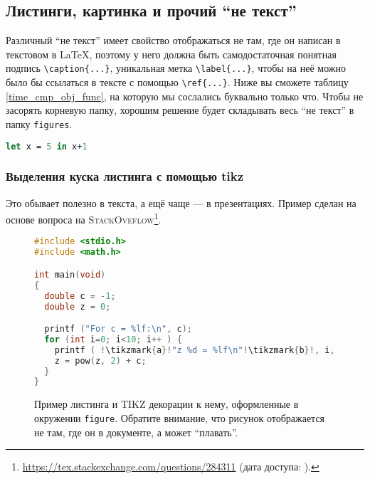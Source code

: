 \subsection{Листинги, картинка и прочий ``не текст''}

Различный ``не текст'' имеет свойство отображаться не там, где он написан в текстовом в \LaTeX{}, поэтому у него должна быть самодостаточ\-ная понятная подпись \verb=\caption{...}=, уникальная метка \verb=\label{...}=, чтобы на неё можно было бы ссылаться в тексте с помощью \verb=\ref{...}=. Ниже вы сможете таблицу \ref{time_cmp_obj_func}, на которую мы сослались буквально только что.
Чтобы не засорять корневую папку, хорошим решение будет складывать весь ``не текст'' в папку \texttt{figures}.

\begin{lstlisting}[caption={Название для листинга кода. Достаточно длинное, чтобы люди, которые смотрят картинку сразу после названия статьи (т.~е. все люди), смогли разобраться и понять к чему в статье листинги, картинки и прочий ``не текст''.}, language=Caml, frame=single]
  let x = 5 in x+1
\end{lstlisting}



\subsubsection{Выделения куска листинга с помощью tikz}
Это обывает полезно в текста, а ещё чаще --- в презентациях. Пример сделан на основе вопроса на \textsc{StackOveflow}\footnote{\url{https://tex.stackexchange.com/questions/284311} (дата доступа:   ).}.

\begin{figure}
\begin{lstlisting}[escapechar=!,basicstyle=\ttfamily, language=c]
#include <stdio.h>
#include <math.h>

int main(void)
{
  double c = -1;
  double z = 0;

  printf ("For c = %lf:\n", c);
  for (int i=0; i<10; i++ ) {
    printf ( !\tikzmark{a}!"z %d = %lf\n"!\tikzmark{b}!, i, z);
    z = pow(z, 2) + c;
  }
}
\end{lstlisting}

\caption{Пример листинга и \textsc{TIKZ} декорации к нему, оформленные в окружении \texttt{figure}. Обратите внимание, что рисунок отображается не там, где он в документе, а может ``плавать''.}
\end{figure}